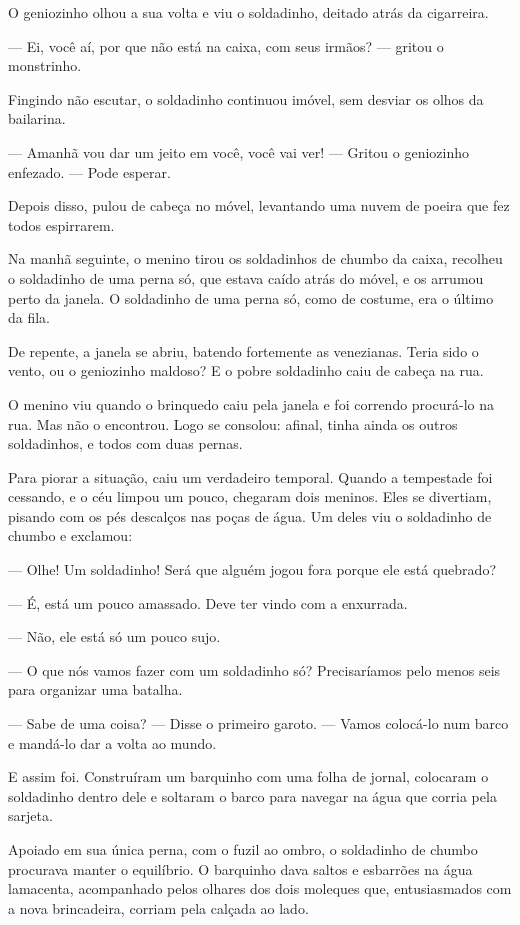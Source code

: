 \begin{conteudo}
\begin{conteudo}
\begin{conteudo}
\begin{conteudo}
\begin{conteudo}
\begin{myquote}
O geniozinho olhou a sua volta e viu o soldadinho, deitado atrás da
cigarreira.

--- Ei, você aí, por que não está na caixa, com seus irmãos? --- gritou
o monstrinho.

Fingindo não escutar, o soldadinho continuou imóvel, sem desviar os
olhos da bailarina.

--- Amanhã vou dar um jeito em você, você vai ver! --- Gritou o geniozinho
enfezado. --- Pode esperar.

Depois disso, pulou de cabeça no móvel, levantando uma nuvem de poeira que fez todos espirrarem.

Na manhã seguinte, o menino tirou os soldadinhos de chumbo da caixa,
recolheu o soldadinho de uma perna só, que estava caído atrás do móvel, e
os arrumou perto da janela. O soldadinho de uma perna só, como de
costume, era o último da fila.

De repente, a janela se abriu, batendo fortemente as venezianas. Teria
sido o vento, ou o geniozinho maldoso? E o pobre soldadinho caiu de
cabeça na rua.

O menino viu quando o brinquedo caiu pela janela e foi correndo
procurá-lo na rua. Mas não o encontrou. Logo se consolou: afinal, tinha
ainda os outros soldadinhos, e todos com duas pernas.

Para piorar a situação, caiu um verdadeiro temporal. Quando a tempestade
foi cessando, e o céu limpou um pouco, chegaram dois meninos. Eles se
divertiam, pisando com os pés descalços nas poças de água. Um deles viu
o soldadinho de chumbo e exclamou:

--- Olhe! Um soldadinho! Será que alguém jogou fora porque ele está
quebrado?

--- É, está um pouco amassado. Deve ter vindo com a enxurrada.

--- Não, ele está só um pouco sujo.

--- O que nós vamos fazer com um soldadinho só? Precisaríamos pelo menos
seis para organizar uma batalha.

--- Sabe de uma coisa? --- Disse o primeiro garoto. --- Vamos colocá-lo
num barco e mandá-lo dar a volta ao mundo.

E assim foi. Construíram um barquinho com uma folha de jornal, colocaram
o soldadinho dentro dele e soltaram o barco para navegar na água que
corria pela sarjeta.

Apoiado em sua única perna, com o fuzil ao ombro, o soldadinho de chumbo
procurava manter o equilíbrio. O barquinho dava saltos e esbarrões na
água lamacenta, acompanhado pelos olhares dos dois moleques que,
entusiasmados com a nova brincadeira, corriam pela calçada ao lado.


\end{myquote}
\end{conteudo}
\end{conteudo}
\end{conteudo}
\end{conteudo}
\end{conteudo}
